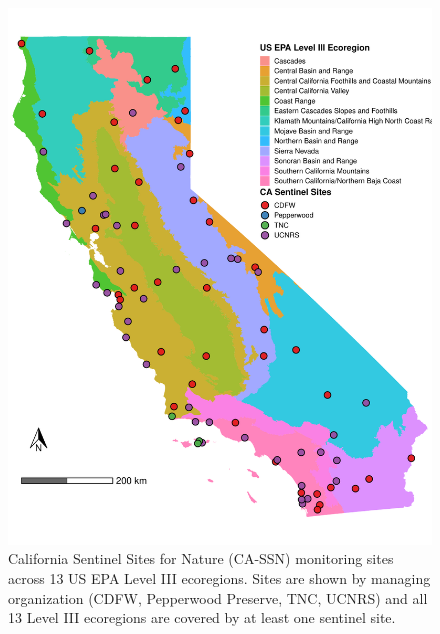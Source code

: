 \documentclass[
  letterpaper,
  DIV=11,
  numbers=noendperiod]{scrartcl}
\begin{document}
\begin{figure}[H]

{\centering \includegraphics[width=1\textwidth,height=\textheight]{01_analyze_files/figure-pdf/map-L3-SSN-1.pdf}

}

\caption{California Sentinel Sites for Nature (CA-SSN) monitoring sites
across 13 US EPA Level III ecoregions. Sites are shown by managing
organization (CDFW, Pepperwood Preserve, TNC, UCNRS) and all 13 Level
III ecoregions are covered by at least one sentinel site.}

\end{figure}%

\begingroup\fontsize{9}{11}\selectfont
\end{document}
